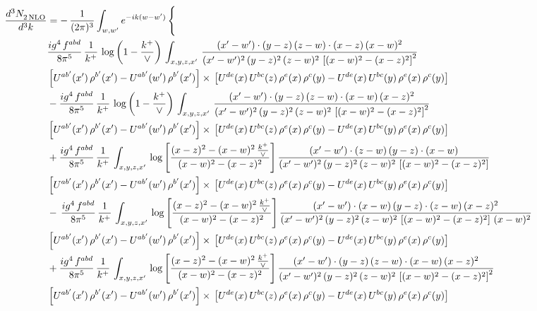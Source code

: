 \documentclass[9pt]{article}
\numberwithin{equation}{section}
\begin{document}
\begin{align}
   \frac{d^{3}N_{2\,\rm NLO}^{\rm}}{d^{3}k}  & =  -\,\frac{1}{(2\pi)^{3}}  \int_{w, w^\prime} e^{-ik(w-w^\prime)}\, \Bigg\{\notag \\ &  \frac{ig^{4}\, f^{abd}}{8\pi^{5}}\, \frac{1}{k^{+}}\,\log{\left(1-\frac{k^{+}}{\vee}\right)}\, \int_{x,y,z,x'}\,\frac{(x'-w')\cdot  (y-z)\, (z-w)\cdot (x-z)\, (x-w)^{2}}{(x'-w')^{2}\, (y-z)^{2}\, (z-w)^{2}\,\left[(x-w)^{2}-(x-z)^{2}\right]^{2}}\, \notag \\ & \left[U^{ab'}(x')\,\rho^{b'}(x')-U^{ab'}(w')\, \rho^{b'}(x')\right]\times\,\left[U^{de}(x)\,U^{bc}(z)\, \rho^{e}(x)\,\rho^{c}(y)-U^{de}(x)\,U^{bc}(y)\,\rho^{e}(x)\,\rho^{c}(y)\right] \notag \\ &   - \frac{ig^{4}\, f^{abd}}{8\pi^{5}}\, \frac{1}{k^{+}}\,\log{\left(1-\frac{k^{+}}{\vee}\right)}\, \int_{x,y,z,x'}\,\frac{(x'-w')\cdot  (y-z)\, (z-w)\cdot (x-w)\, (x-z)^{2}}{(x'-w')^{2}\, (y-z)^{2}\, (z-w)^{2}\,\left[(x-w)^{2}-(x-z)^{2}\right]^{2}}\, \notag \\ & \left[U^{ab'}(x')\,\rho^{b'}(x')-U^{ab'}(w')\, \rho^{b'}(x')\right]\times\,\left[U^{de}(x)\,U^{bc}(z)\, \rho^{e}(x)\,\rho^{c}(y)-U^{de}(x)\,U^{bc}(y)\,\rho^{e}(x)\,\rho^{c}(y)\right] \notag \\
&  + \frac{ig^{4}\, f^{abd}}{8\pi^{5}}\, \frac{1}{k^{+}}\, \int_{x,y,z,x'}\,\log{\left[\frac{(x-z)^{2}-(x-w)^{2}\,\frac{k^{+}}{\vee}}{(x-w)^{2}-(x-z)^{2}}\right]}\,\frac{(x'-w')\cdot (z-w)\, (y-z)\cdot (x-w)}{(x'-w')^{2}\, (y-z)^{2}\, (z-w)^{2}\,\left[(x-w)^{2}-(x-z)^{2}\right]}\, \notag \\ & \left[U^{ab'}(x')\,\rho^{b'}(x')-U^{ab'}(w')\, \rho^{b'}(x')\right]\times\,\left[U^{de}(x)\,U^{bc}(z)\, \rho^{e}(x)\,\rho^{c}(y)-U^{de}(x)\,U^{bc}(y)\,\rho^{e}(x)\,\rho^{c}(y)\right] \notag \\
& -\,\frac{ig^{4}\, f^{abd}}{8\pi^{5}}\, \frac{1}{k^{+}}\, \int_{x,y,z,x'}\,\log{\left[\frac{(x-z)^{2}-(x-w)^{2}\,\frac{k^{+}}{\vee}}{(x-w)^{2}-(x-z)^{2}}\right]}\,\frac{(x'-w')\cdot (x-w)\, (y-z)\cdot(z-w)\,(x-z)^{2}}{(x'-w')^{2}\, (y-z)^{2}\, (z-w)^{2}\,\left[(x-w)^{2}-(x-z)^{2}\right]\,(x-w)^{2}}\, \notag \\ & \left[U^{ab'}(x')\,\rho^{b'}(x')-U^{ab'}(w')\, \rho^{b'}(x')\right]\times\,\left[U^{de}(x)\,U^{bc}(z)\, \rho^{e}(x)\,\rho^{c}(y)-U^{de}(x)\,U^{bc}(y)\,\rho^{e}(x)\,\rho^{c}(y)\right] \notag \\
& +\frac{ig^{4}\, f^{abd}}{8\pi^{5}}\, \frac{1}{k^{+}}\, \int_{x,y,z,x'}\,\log{\left[\frac{(x-z)^{2}-(x-w)^{2}\,\frac{k^{+}}{\vee}}{(x-w)^{2}-(x-z)^{2}}\right]}\,\frac{(x'-w')\cdot  (y-z)\, (z-w)\cdot (x-w)\, (x-z)^{2}}{(x'-w')^{2}\, (y-z)^{2}\, (z-w)^{2}\,\left[(x-w)^{2}-(x-z)^{2}\right]^{2}}\, \notag \\ & \left[U^{ab'}(x')\,\rho^{b'}(x')-U^{ab'}(w')\, \rho^{b'}(x')\right]\times\,\left[U^{de}(x)\,U^{bc}(z)\, \rho^{e}(x)\,\rho^{c}(y)-U^{de}(x)\,U^{bc}(y)\,\rho^{e}(x)\,\rho^{c}(y)\right] \notag \\

\end{align}
\end{document}
